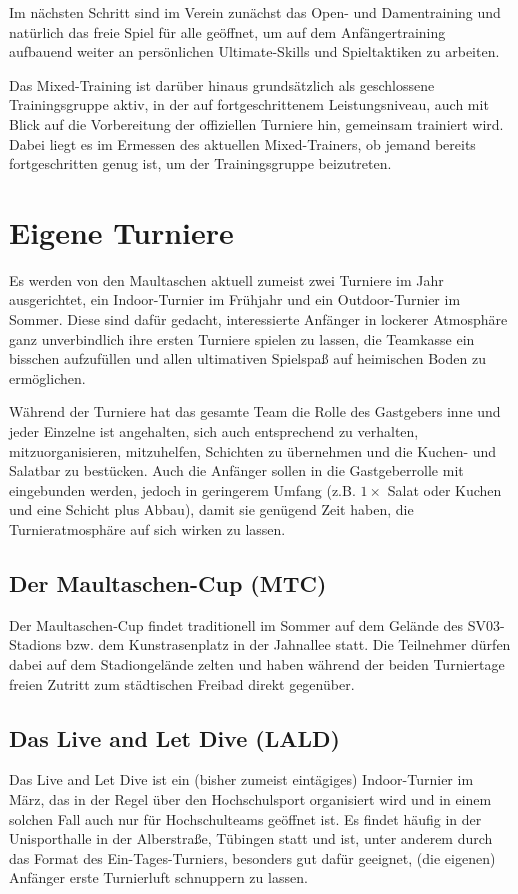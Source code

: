 \documentclass[a4 paper, 11pt]{article}
\begin{document}
Im nächsten Schritt sind im Verein zunächst das Open- und Damentraining und natürlich das freie Spiel für alle geöffnet, um auf dem Anfängertraining aufbauend weiter an persönlichen Ultimate-Skills und Spieltaktiken zu arbeiten.

Das Mixed-Training ist darüber hinaus grundsätzlich als geschlossene Trainingsgruppe aktiv, in der auf fortgeschrittenem Leistungsniveau, auch mit Blick auf die Vorbereitung der offiziellen Turniere hin, gemeinsam trainiert wird. Dabei liegt es im Ermessen des aktuellen Mixed-Trainers, ob jemand bereits fortgeschritten genug ist, um der Trainingsgruppe beizutreten. 


\section{Eigene Turniere}
Es werden von den Maultaschen aktuell zumeist zwei Turniere im Jahr ausgerichtet, ein Indoor-Turnier im Frühjahr und ein Outdoor-Turnier im Sommer. Diese sind dafür gedacht, interessierte Anfänger in lockerer Atmosphäre ganz unverbindlich ihre ersten Turniere spielen zu lassen, die Teamkasse ein bisschen aufzufüllen und allen ultimativen Spielspaß auf heimischen Boden zu ermöglichen.

Während der Turniere hat das gesamte Team die Rolle des Gastgebers inne und jeder Einzelne ist angehalten, sich auch entsprechend zu verhalten, mitzuorganisieren, mitzuhelfen, Schichten zu übernehmen und die Kuchen- und Salatbar zu bestücken. Auch die Anfänger sollen in die Gastgeberrolle mit eingebunden werden, jedoch in geringerem Umfang (z.B. $1\times$ Salat oder Kuchen und eine Schicht plus Abbau), damit sie genügend Zeit haben, die Turnieratmosphäre auf sich wirken zu lassen.

\subsection{Der Maultaschen-Cup (MTC)}
Der Maultaschen-Cup findet traditionell im Sommer auf dem Gelände des SV03-Stadions bzw. dem Kunstrasenplatz in der Jahnallee statt. Die Teilnehmer dürfen dabei auf dem Stadiongelände zelten und haben während der beiden Turniertage freien Zutritt zum städtischen Freibad direkt gegenüber.

\subsection{Das Live and Let Dive (LALD)}
Das Live and Let Dive ist ein (bisher zumeist eintägiges) Indoor-Turnier im März, das in der Regel über den Hochschulsport organisiert wird und in einem solchen Fall auch nur für Hochschulteams geöffnet ist. Es findet häufig in der Unisporthalle in der Alberstraße, Tübingen statt und ist, unter anderem durch das Format des Ein-Tages-Turniers, besonders gut dafür geeignet, (die eigenen) Anfänger erste Turnierluft schnuppern zu lassen.
\end{document}
